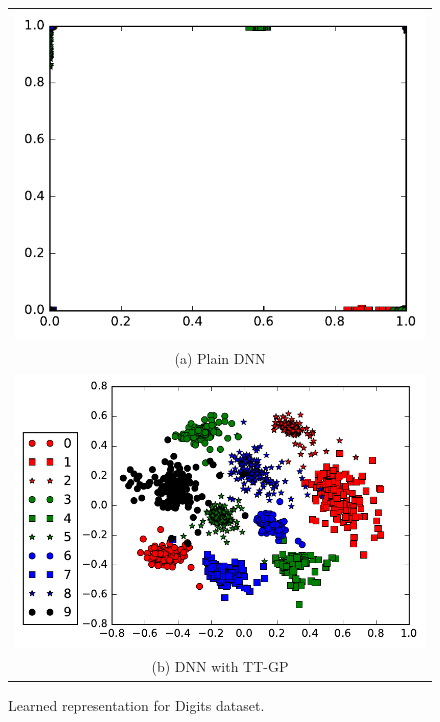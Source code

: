 \begin{figure}[!t]
  \vspace{-.3cm}
  \begin{center}
      \begin{tabular}{c}
        \hspace{1.cm}\includegraphics[height=0.6\linewidth]{pics/embedding_dnn.pdf}\\
           (a) Plain DNN\\
          \includegraphics[height=0.6\linewidth]{pics/embedding_ttgp.pdf} \\
          (b) DNN with TT-GP \\
      \end{tabular}
  \end{center}
  \caption{Learned representation for Digits dataset.}
  \label{digits_embedding}
  \vspace{-.5cm}
\end{figure}

